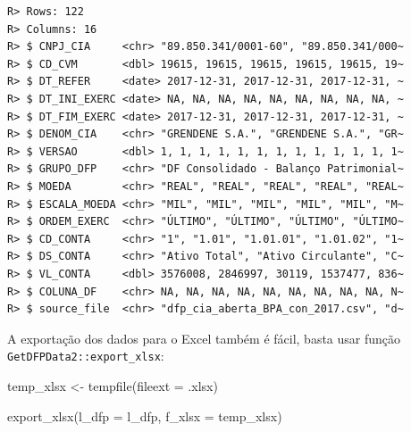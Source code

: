 \documentclass[
  11pt,
]{book}
\newenvironment{Shaded}{\begin{snugshade}}{\end{snugshade}}
\newcommand{\AttributeTok}[1]{\textcolor[rgb]{0.61,0.61,0.61}{#1}}
\newcommand{\CommentTok}[1]{\textcolor[rgb]{0.37,0.37,0.37}{\textit{#1}}}
\newcommand{\FunctionTok}[1]{\textcolor[rgb]{0,0,0}{#1}}
\newcommand{\NormalTok}[1]{#1}
\newcommand{\OtherTok}[1]{\textcolor[rgb]{0.37,0.37,0.37}{#1}}
\newcommand{\SpecialCharTok}[1]{\textcolor[rgb]{0,0,0}{#1}}
\newcommand{\StringTok}[1]{\textcolor[rgb]{0.5,0.5,0.5}{#1}}
\begin{document}
\begin{Shaded}
\end{Shaded}

\begin{verbatim}
R> Rows: 122
R> Columns: 16
R> $ CNPJ_CIA     <chr> "89.850.341/0001-60", "89.850.341/000~
R> $ CD_CVM       <dbl> 19615, 19615, 19615, 19615, 19615, 19~
R> $ DT_REFER     <date> 2017-12-31, 2017-12-31, 2017-12-31, ~
R> $ DT_INI_EXERC <date> NA, NA, NA, NA, NA, NA, NA, NA, NA, ~
R> $ DT_FIM_EXERC <date> 2017-12-31, 2017-12-31, 2017-12-31, ~
R> $ DENOM_CIA    <chr> "GRENDENE S.A.", "GRENDENE S.A.", "GR~
R> $ VERSAO       <dbl> 1, 1, 1, 1, 1, 1, 1, 1, 1, 1, 1, 1, 1~
R> $ GRUPO_DFP    <chr> "DF Consolidado - Balanço Patrimonial~
R> $ MOEDA        <chr> "REAL", "REAL", "REAL", "REAL", "REAL~
R> $ ESCALA_MOEDA <chr> "MIL", "MIL", "MIL", "MIL", "MIL", "M~
R> $ ORDEM_EXERC  <chr> "ÚLTIMO", "ÚLTIMO", "ÚLTIMO", "ÚLTIMO~
R> $ CD_CONTA     <chr> "1", "1.01", "1.01.01", "1.01.02", "1~
R> $ DS_CONTA     <chr> "Ativo Total", "Ativo Circulante", "C~
R> $ VL_CONTA     <dbl> 3576008, 2846997, 30119, 1537477, 836~
R> $ COLUNA_DF    <chr> NA, NA, NA, NA, NA, NA, NA, NA, NA, N~
R> $ source_file  <chr> "dfp_cia_aberta_BPA_con_2017.csv", "d~
\end{verbatim}

A exportação dos dados para o Excel também é fácil, basta usar função \texttt{GetDFPData2::export\_xlsx}: 

\begin{Shaded}
\begin{Highlighting}[]
\NormalTok{temp\_xlsx }\OtherTok{\textless{}{-}} \FunctionTok{tempfile}\NormalTok{(}\AttributeTok{fileext =} \StringTok{\textquotesingle{}.xlsx\textquotesingle{}}\NormalTok{)}

\FunctionTok{export\_xlsx}\NormalTok{(}\AttributeTok{l\_dfp =}\NormalTok{ l\_dfp, }\AttributeTok{f\_xlsx =}\NormalTok{ temp\_xlsx)}
\end{Highlighting}
\end{Shaded}
\end{document}
